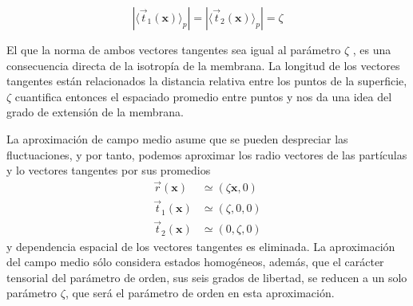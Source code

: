 \begin{equation*}
|\langle\vec{t}_1(\mathbf{x})\rangle_{p}|=|\langle\vec{t}_2(\mathbf{x})\rangle_{p}|=\zeta
\end{equation*}

El que la norma de ambos vectores tangentes sea igual al parámetro $\zeta$ , es
una consecuencia directa de la isotropía de la membrana. La longitud de los
vectores tangentes están relacionados la distancia relativa entre los puntos
de la superficie, $\zeta$ cuantifica entonces el espaciado promedio entre
puntos y nos da una idea del grado de extensión de la membrana.

La aproximación de campo medio asume que se pueden despreciar las
fluctuaciones, y por tanto, podemos aproximar los radio vectores de las
partículas y lo vectores tangentes por sus promedios
\begin{align*}
 \vec{r}(\mathbf{x})&\simeq(\zeta \mathbf{x},0)\\
 \vec{t}_1(\mathbf{x})&\simeq(\zeta ,0,0)\\
 \vec{t}_2(\mathbf{x})&\simeq(0,\zeta,0)
\end{align*}
y dependencia espacial de los vectores tangentes es eliminada. La
aproximación del campo medio sólo considera estados homogéneos, además, que
el carácter tensorial del parámetro de orden, sus seis grados de libertad, se
reducen a un solo parámetro $\zeta$, que será el parámetro de orden en esta
aproximación.

